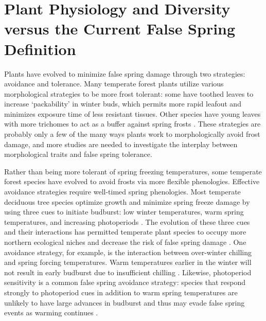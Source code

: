 \documentclass{article}\usepackage[]{graphicx}\usepackage[]{color}
\begin{document}
\section* {Plant Physiology and Diversity versus the Current False Spring Definition}
Plants have evolved to minimize false spring damage through two strategies: avoidance and tolerance. Many temperate forest plants utilize various morphological strategies to be more frost tolerant: some have toothed leaves to increase `packability' in winter buds, which permits more rapid leafout \citep{Edwards2017} and minimizes exposure time of less resistant tissues. Other species have young leaves with more trichomes to act as a buffer against spring frosts \citep{Prozherina2003, Agrawal2004}. These strategies are probably only a few of the many ways plants work to morphologically avoid frost damage, and more studies are needed to investigate the interplay between morphological traits and false spring tolerance. 

Rather than being more tolerant of spring freezing temperatures, some temperate forest species have evolved to avoid frosts via more flexible phenologies. Effective avoidance strategies require well-timed spring phenologies. Most temperate deciduous tree species optimize growth and minimize spring freeze damage by using three cues to initiate budburst: low winter temperatures, warm spring temperatures, and increasing photoperiods \citep{Chuine2010}. The evolution of these three cues and their interactions has permitted temperate plant species to occupy more northern ecological niches \citep{Kollas2014} and decrease the risk of false spring damage%
\citep{Charrier2011}. One avoidance strategy, for example, is the interaction between over-winter chilling and spring forcing temperatures. Warm temperatures earlier in the winter %
will not result in early budburst due to insufficient chilling \citep{Basler2012}. Likewise, photoperiod sensitivity is a common false spring avoidance strategy: species that respond strongly to photoperiod cues in addition to warm spring temperatures are unlikely to have large advances in budburst and thus may evade false spring events as warming continues \citep{Basler2014}. 
\end{document}
